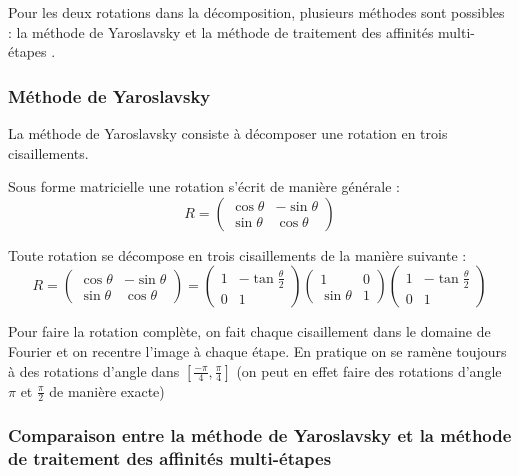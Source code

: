 
Pour les deux rotations dans la décomposition, plusieurs méthodes sont possibles : la méthode de Yaroslavsky \cite{unser1995convolution} et la méthode de traitement des affinités multi-étapes \cite{szeliski2010high}.

\subsubsection{Méthode de Yaroslavsky}

La méthode de Yaroslavsky consiste à décomposer une rotation en trois cisaillements.

Sous forme matricielle une rotation s'écrit de manière générale :
\begin{equation*}
	R=\begin{pmatrix}
	\cos \theta&-\sin \theta\\\sin \theta&\cos \theta
	\end{pmatrix}
	\end{equation*}
\begin{prop}
Toute rotation se décompose en trois cisaillements de la manière suivante :
\begin{equation*}
	R=\begin{pmatrix}
	\cos \theta&-\sin \theta\\\sin \theta&\cos \theta
	\end{pmatrix}=\begin{pmatrix}
	1&-\tan \frac{\theta}{2}\\0&1
	\end{pmatrix}\begin{pmatrix}
	1&0\\\sin \theta&1
	\end{pmatrix}\begin{pmatrix}
	1&-\tan \frac{\theta}{2}\\0&1
	\end{pmatrix}
	\end{equation*}
\end{prop}

	Pour faire la rotation complète, on fait chaque cisaillement dans le domaine de Fourier et on recentre l'image à chaque étape. 
	En pratique on se ramène toujours à des rotations d'angle dans $[\frac{-\pi}{4},\frac{\pi}{4}]$ (on peut en effet faire des rotations d'angle $\pi$ et $\frac{\pi}{2}$ de manière exacte)  


\subsubsection{Comparaison entre la méthode de Yaroslavsky et la méthode de traitement des affinités multi-étapes}


